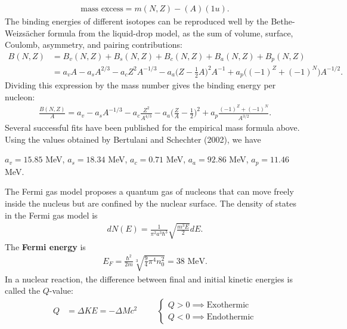 \begin{align}
\textrm{mass excess}=m(N,Z)-(A)(1 u).
\end{align} 
The binding energies of different isotopes can be reproduced well by the Bethe-Weizs\"{a}cher formula from the liquid-drop model, as the sum of volume, surface, Coulomb, asymmetry, and pairing contributions:
\begin{align}
B(N,Z)&=B_v(N,Z)+B_s(N,Z)+B_c(N,Z)+B_a(N,Z)+B_p(N,Z) \\
&=a_vA-a_sA^{2/3}-a_cZ^2A^{-1/3}-a_a\bigg(Z-\frac{1}{2}A \bigg)^2A^{-1}+a_p\big((-1)^Z+(-1)^N \big)A^{-1/2}.
\end{align}
Dividing this expression by the mass number gives the binding energy per nucleon:
\begin{align}
\frac{B(N,Z)}{A}=a_v-a_sA^{-1/3}-a_c\frac{Z^2}{A^{4/3}}-a_a\bigg(\frac{Z}{A}-\frac{1}{2} \bigg)^2+a_p\frac{(-1)^Z+(-1)^N}{A^{3/2}}.
\end{align}
Several successful fits have been published for the empirical mass formula above. Using the values obtained by Bertulani and Schechter (2002), we have
\begin{center}
	$a_v=15.85$ MeV, $a_s=18.34$ MeV, $a_c=0.71$ MeV, $a_a=92.86$ MeV, $a_p=11.46$ MeV. 
\end{center}
The Fermi gas model proposes a quantum gas of nucleons that can move freely inside the nucleus but are confined by the nuclear surface. The density of states in the Fermi gas model is 
\begin{align}
dN(E)=\frac{1}{\pi^2 a^3\hbar^3}\sqrt{\frac{m^3E}{2}}dE.
\end{align}
The \textbf{Fermi energy} is
\begin{align}
E_F=\frac{\hbar^2}{2m}\sqrt[3]{\frac{9}{4}\pi^4n_0^2}=38 \textrm{ MeV}.
\end{align}
In a nuclear reaction, the difference between final and initial
kinetic energies is called the $Q$-value:
\begin{align}
Q&=\Delta KE=-\Delta Mc^2 \hspace{1cm}
\begin{cases}
Q>0 \implies \textrm{Exothermic} \\
Q<0 \implies \textrm{Endothermic}
\end{cases}
\end{align}







